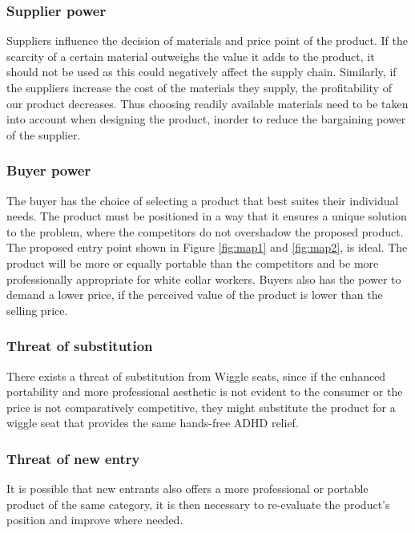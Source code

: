 \documentclass{article}
\begin{document}
    \subsubsection{Supplier power}
    Suppliers influence the decision of materials and price point of the product. If the scarcity of a certain material outweighs the value it adds to the product, it should not be used as this could negatively affect the supply chain. Similarly, if the suppliers increase the cost of the materials they supply, the profitability of our product decreases. Thus choosing readily available materials need to be taken into account when designing the product, inorder to reduce the bargaining power of the supplier.
    
    \subsubsection{Buyer power}
    The buyer has the choice of selecting a product that best suites their individual needs. The product must be positioned in a way that it ensures a unique solution to the problem, where the competitors do not overshadow the proposed product. The proposed entry point shown in Figure \ref{fig:map1} and \ref{fig:map2}, is ideal. The product will be more or equally portable than the competitors and be more professionally appropriate for white collar workers. Buyers also has the power to demand a lower price, if the perceived value of the product is lower than the selling price. 
    

    \subsubsection{Threat of substitution}
    There exists a threat of substitution from Wiggle seats, since if the enhanced portability and more professional aesthetic is not evident to the consumer or the price is not comparatively competitive, they might substitute the product for a wiggle seat that provides the same hands-free ADHD relief.
    \subsubsection{Threat of new entry}
    It is possible that new entrants also offers a more professional or portable product of the same category, it is then necessary to re-evaluate the product's position and improve where needed.
\end{document}
